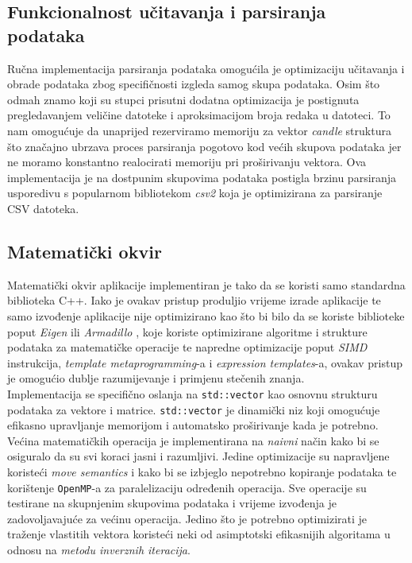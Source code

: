 \documentclass[zavrsnirad]{fer}
\begin{document}
\subsection{Funkcionalnost učitavanja i parsiranja podataka}
Ručna implementacija parsiranja podataka omogućila je
optimizaciju učitavanja i obrade podataka zbog specifičnosti
izgleda samog skupa podataka. Osim što odmah znamo koji su stupci
prisutni dodatna optimizacija je postignuta pregledavanjem veličine
datoteke i aproksimacijom broja redaka u datoteci. To nam omogućuje
da unaprijed rezerviramo memoriju za vektor \emph{candle} struktura
što značajno ubrzava proces parsiranja pogotovo kod većih skupova
podataka jer ne moramo konstantno realocirati memoriju pri proširivanju
vektora. Ova implementacija je na dostpunim skupovima podataka
postigla brzinu parsiranja usporedivu s popularnom bibliotekom
\emph{csv2} \cite{csv2} koja je optimizirana za parsiranje CSV datoteka.

\subsection{Matematički okvir}
\label{sek:matematicki_okvir_rezultati}
Matematički okvir aplikacije implementiran je tako da
se koristi samo standardna biblioteka C++. Iako je ovakav pristup
produljio vrijeme izrade aplikacije te samo izvođenje aplikacije
nije optimizirano kao što bi bilo da se koriste biblioteke poput
\emph{Eigen} \cite{Eigen3} ili \emph{Armadillo} \cite{10980539},
koje koriste optimizirane algoritme i strukture podataka za
matematičke operacije te napredne optimizacije poput \emph{SIMD} instrukcija,
\emph{template metaprogramming}-a i \emph{expression templates}-a,
ovakav pristup je omogućio dublje razumijevanje i primjenu
stečenih znanja.\\
Implementacija se specifično oslanja
na \texttt{std::vector} kao osnovnu strukturu podataka za vektore i
matrice. \texttt{std::vector} je dinamički niz koji omogućuje
efikasno upravljanje memorijom i automatsko proširivanje
kada je potrebno.\\
Većina matematičkih operacija je implementirana na \emph{naivni} način
kako bi se osiguralo da su svi koraci jasni i razumljivi. Jedine
optimizacije su napravljene koristeći \emph{move semantics} i
kako bi se izbjeglo nepotrebno kopiranje podataka te korištenje
\texttt{OpenMP}-a \cite{660313} za paralelizaciju određenih operacija.
Sve operacije su testirane na skupnjenim skupovima podataka i
vrijeme izvođenja je zadovoljavajuće za većinu operacija. Jedino
što je potrebno optimizirati je traženje vlastitih vektora koristeći
neki od asimptotski efikasnijih algoritama u odnosu na \emph{metodu
inverznih iteracija}.
\end{document}
